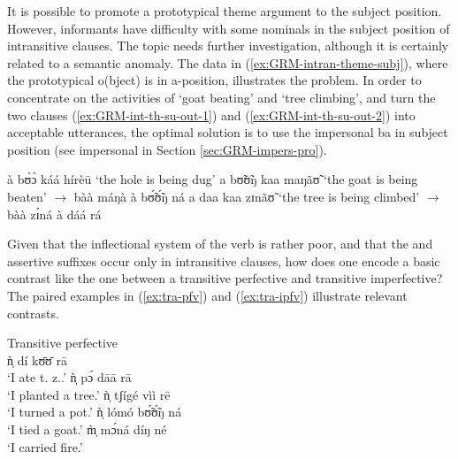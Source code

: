 \begin{exe}
\begin{exe}
\begin{exe}
\begin{exe}
\begin{exe}
\begin{exe}
\begin{exe}
\begin{exe}
\begin{exe}
\begin{exe}
\begin{exe}
It is possible to promote a prototypical theme argument to the subject position. However,  informants have difficulty with some nominals in the subject position of intransitive clauses.   The topic needs further investigation, although it is certainly related to a semantic anomaly.  The data in (\ref{ex:GRM-intran-theme-subj}), where the  prototypical {\sc o}(bject) is in {\sc a}-position, illustrates the problem. In order to concentrate on the activities of  `goat beating' and `tree climbing',  and turn the two clauses (\ref{ex:GRM-int-th-su-out-1}) and (\ref{ex:GRM-int-th-su-out-2}) into acceptable utterances,  the optimal solution is to use the impersonal  {\sls ba} in subject position  (see impersonal  in Section \ref{sec:GRM-impers-pro}).



\ea\label{ex:GRM-intran-theme-subj}

\ea
à bʊ̀ɔ̀ káá hírèū  {\rm `the hole is being dug'}
\ex\label{ex:GRM-int-th-su-out-1}
\textasteriskcentered a bʊ̃ʊ̃ŋ   kaa maŋãʊ̃  {\rm  `the goat is being beaten' }
$\rightarrow$ {\sls 
bàà máŋà à bʊ̃́ʊ̃́ŋ ná}
\ex\label{ex:GRM-int-th-su-out-2}
\textasteriskcentered a daa kaa zɪnãʊ̃  {\rm   `the tree is being climbed'}   
$\rightarrow$ {\sls 
bàà zɪ́ná à dáá rá}


\z 
 \z


Given that  the inflectional system of the verb is rather poor, and that the 
and assertive suffixes occur only in intransitive clauses,  how does one
encode a basic contrast like the one between a transitive perfective and
transitive imperfective? The paired examples in (\ref{ex:tra-pfv}) and
(\ref{ex:tra-ipfv})  illustrate 
 relevant contrasts.\nolinebreak 
 


\ea\label{ex:tra-pfv}{\rm Transitive perfective}\\

  \ea\label{ex:tra-pfv-eat}
ǹ̩ dí kʊ̄ʊ̄ rā\\
{\rm  `I ate {\sc t. z.}.'} 
 \ex\label{ex:tra-pfv-plant}
ǹ̩ pɔ́ dāā rā\\
{\rm `I planted a {\sc tree}.'}
 \ex\label{ex:tra-pfv-cover}
ǹ̩ tʃígé vìì rē\\
{\rm `I turned a {\sc  pot}.'} 
 \ex\label{ex:tra-pfv-tie}
ǹ̩ lómó bʊ̃́ʊ̃́ŋ ná\\
{\rm `I tied a {\sc goat}.'}
 \ex\label{ex:tra-pfv-carry}
m̩̀ mɔ́ná díŋ né\\
{\rm `I carried {\sc fire}.'} 


\end{exe}
\end{exe}
\end{exe}
\end{exe}
\end{exe}
\end{exe}
\end{exe}
\end{exe}
\end{exe}
\end{exe}
\end{exe}
